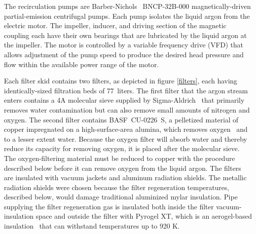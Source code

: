 
The recirculation pumps are Barber-Nichols~\cite{barber-nichols} BNCP-32B-000 magnetically-driven partial-emission centrifugal pumps.  Each pump isolates the liquid argon from the electric motor.  The impeller, inducer, and driving section of the magnetic coupling each have their own bearings that are lubricated by the liquid argon at the impeller.  The motor is controlled by a variable frequency drive (VFD) that allows adjustment of the pump speed to produce the desired head pressure and flow within the available power range of the motor.    


Each filter skid contains two filters, as depicted in figure \ref{filters}, each having identically-sized filtration beds of 77~liters.  The first filter that the argon stream enters contains a 4A molecular sieve supplied by Sigma-Aldrich~\cite{sigma-aldrich} that primarily removes water contamination but can also remove small amounts of nitrogen and oxygen.  The second filter contains BASF~CU-0226~S, a pelletized material of copper impregnated on a high-surface-area alumina, which removes oxygen~\cite{basf} and to a lesser extent water.  Because the oxygen filter will absorb water and thereby reduce its capacity for removing oxygen, it is placed after the molecular sieve.  The oxygen-filtering material must be reduced to copper with the procedure described below before it can remove oxygen from the liquid argon.  The filters are insulated with vacuum jackets and aluminum radiation shields.  The metallic radiation shields were chosen because the filter regeneration temperatures, described below, would damage traditional aluminized mylar insulation.  Pipe supplying the filter regeneration gas is insulated both inside the filter vacuum-insulation space and outside the filter with Pyrogel XT, which is an aerogel-based insulation~\cite{aspen-aerogels} that can withstand temperatures up to 920 K. 

